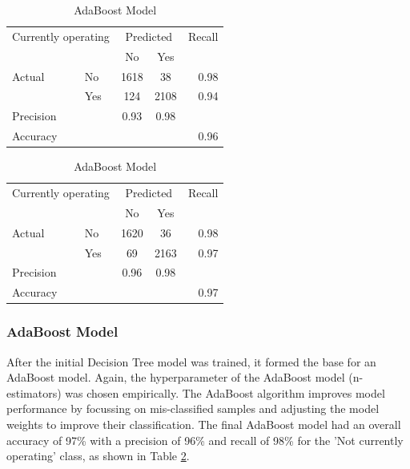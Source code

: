 \documentclass[11pt, letterpaper]{article}
\begin{document}
\begin{table}[h]
 	\caption{Confusion matrices and Evaluation metrics} 
 	\begin{minipage}{.5\linewidth}
		\caption{Decision Tree Model}
		\centering
		\begin{tabular}{l l | c c r }
\multicolumn{2}{l}{Currently operating} & \multicolumn{2}{c}{Predicted} & Recall \\
& & No & Yes &  \\ 
\cline{2-5}
Actual & No & 1618 &  38 & 0.98 \\
& Yes & 124 & 2108 & 0.94 \\  \hline
Precision&  & 0.93 & 0.98 \\ 
Accuracy & & &  & 0.96 \\
	\end{tabular}
	\label{tab:DTConfusion}
	\end{minipage}%
	\begin{minipage}{.5\linewidth}
	\caption{AdaBoost Model}
	\centering
		\begin{tabular}{l l | c c r }
\multicolumn{2}{l}{Currently operating} & \multicolumn{2}{c}{Predicted} & Recall \\
& & No & Yes &  \\ 
\cline{2-5}
Actual & No & 1620 &  36 & 0.98 \\
& Yes & 69 & 2163 & 0.97 \\  \hline
Precision&  & 0.96 & 0.98 \\ 
Accuracy & & &  & 0.97 \\
	\end{tabular}
	\label{tab:ABConfusion}
	\end{minipage}
\end{table} 

\subsubsection{AdaBoost Model}
After the initial Decision Tree model was trained, it formed the base for an AdaBoost model. Again, the hyperparameter of the AdaBoost model (n-estimators) was chosen empirically. The AdaBoost algorithm improves model performance by focussing on mis-classified samples and adjusting the model weights to improve their classification. The final AdaBoost model had an overall accuracy of 97\% with a precision of 96\% and recall of 98\% for the 'Not currently operating' class, as shown in Table \ref{tab:ABConfusion}.
\end{document}
